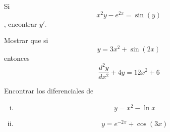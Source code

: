 \begin{problema}
	Si \[x^{2}y-e^{2x}=\sin(y)\], encontrar $y'$.
\end{problema}


\begin{problema}
	Mostrar que si \[y=3x^{2}+\sin(2x)\] entonces
	\[\dfrac{d^{2}y}{dx^{2}}+4y=12x^{2}+6\]
\end{problema}



{}
\begin{problema}
	Encontrar los diferenciales de
	\begin{enumerate}[(i)]
		\item \[y=x^{2}-\ln x\]

		\item \[y = e^{-2x}+\cos(3x)\]
	\end{enumerate}
\end{problema}



